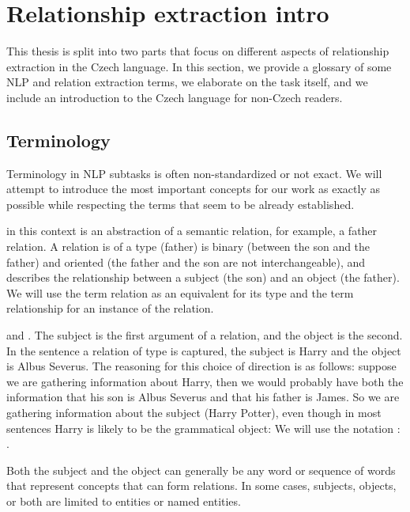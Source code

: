 \chapter{Relationship extraction intro} 

This thesis is split into two parts that focus on different aspects of relationship extraction in the Czech language. In this section, we provide a glossary of some NLP and relation extraction terms, we elaborate on the task itself, and we include an introduction to the Czech language for non-Czech readers.


\section{Terminology}
Terminology in NLP subtasks is often non-standardized or not exact. We will attempt to introduce the most important concepts for our work as exactly as possible while respecting the terms that seem to be already established. 


 in this context is an abstraction of a semantic relation, for example, a father relation. A relation is of a type (father) is binary (between the son and the father) and oriented (the father and the son are not interchangeable), and describes the relationship between a subject (the son) and an object (the father). We will use the term relation as an equivalent for its type and the term relationship for an instance of the relation. 


 and . The subject is the first argument of a relation, and the object is the second. In the sentence  a relation of type  is captured, the subject is Harry and the object is Albus Severus. The reasoning for this choice of direction is as follows: suppose we are gathering information about Harry, then we would probably have both the information that his son is Albus Severus and that his father is James. So we are gathering information about the subject (Harry Potter), even though in most sentences Harry is likely to be the grammatical object:  We will use the notation : . 

Both the subject and the object can generally be any word or sequence of words that represent concepts that can form relations. In some cases, subjects, objects, or both are limited to entities or named entities.

